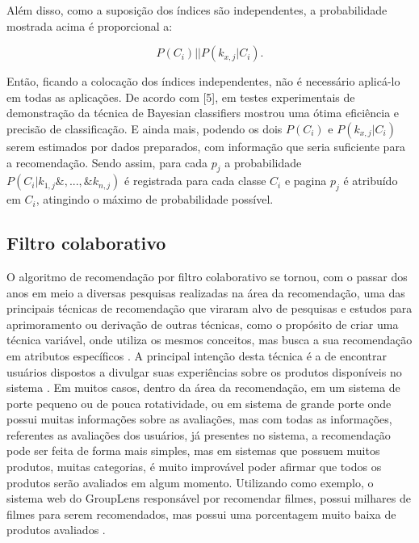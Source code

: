 \documentclass[12pt,
				openright,
				twoside,
				a4paper,
				apter=TITLE,
				section=TITLE,
				subsection=TITLE,
				chapter=TITLE,
				english,
				brazil]{abntex2}
\begin{document}


Além disso, como a suposição dos índices são independentes, a probabilidade mostrada acima é 
proporcional a:

\begin{equation}
P(C_i)||P(k_{x,j}|C_i).
\end{equation}

Então, ficando a colocação dos índices independentes, não é necessário aplicá-lo em todas as aplicações. De acordo com [5], em testes experimentais de demonstração da técnica de Bayesian classifiers mostrou uma ótima eficiência e precisão de classificação. E ainda mais, podendo os dois $P(C_i)$ e $P(k_{x,j}|C_i)$ serem estimados por dados preparados, com informação que seria suficiente para a recomendação. Sendo assim, para cada $p_j$ a probabilidade $P(C_i| k_{1,j}\&,...,\&k_{n,j})$ é registrada para cada classe $C_i$ e pagina $p_j$ é atribuído em $C_i$, atingindo o máximo de probabilidade possível.


\subsection{Filtro colaborativo}
O algoritmo de recomendação por filtro colaborativo se tornou, com o passar dos anos em meio a diversas pesquisas realizadas na área da recomendação, uma das principais técnicas de recomendação que viraram alvo de pesquisas e estudos para aprimoramento ou derivação de outras técnicas, como o propósito de criar uma técnica variável, onde utiliza os mesmos conceitos, mas busca a sua recomendação em atributos específicos \cite{asanov2011algorithms}. A principal intenção desta técnica é a de encontrar usuários dispostos a divulgar suas experiências sobre os produtos disponíveis no sistema \cite{linden2003amazon}. Em muitos casos, dentro da área da recomendação, em um sistema de porte pequeno ou de pouca rotatividade, ou em sistema de grande porte onde possui muitas informações sobre as avaliações, mas com todas as informações, referentes as avaliações dos usuários, já presentes no sistema, a recomendação pode ser feita de forma mais simples, mas em sistemas que possuem muitos produtos, muitas categorias, é muito improvável poder afirmar que todos os produtos serão avaliados em algum momento. Utilizando como exemplo, o sistema web do GroupLens responsável por recomendar filmes, possui milhares de filmes para serem recomendados, mas possui uma porcentagem muito baixa de produtos avaliados \cite{miller2003movielens}. 
\end{document}
